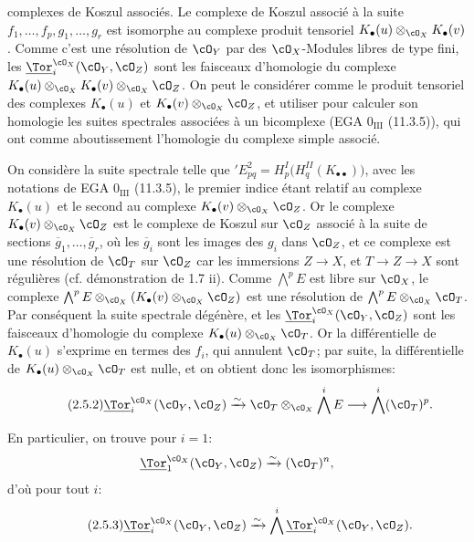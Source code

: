 complexes de Koszul associés. Le complexe de Koszul associé à la suite \(f_1,\ldots,f_p,g_1,\ldots,g_r\) est isomorphe au complexe produit tensoriel \(K_\bullet(u)\otimes_{\cO_X}K_\bullet(v)\). Comme c'est une résolution de \(\cO_Y\) par des \(\cO_X\)-Modules libres de type fini, les \(\underline{\Tor}_i^{\cO_X}(\cO_Y,\cO_Z)\) sont les faisceaux d'homologie du complexe \(K_\bullet(u)\otimes_{\cO_X}K_\bullet(v)\otimes_{\cO_X}\cO_Z\). On peut le considérer comme le produit tensoriel des complexes \(K_\bullet(u)\) et \(K_\bullet(v)\otimes_{\cO_X}\cO_Z\), et utiliser pour calculer son homologie les suites spectrales associées à un bicomplexe (EGA \(0_{\mathrm{III}}\) (11.3.5)), qui ont comme aboutissement l'homologie du complexe simple associé.

On considère la suite spectrale telle que \({}'E^2_{pq}=H^I_p\bigl(H^{II}_q(K_{\bullet\bullet})\bigr)\), avec les notations de EGA \(0_{\mathrm{III}}\) (11.3.5), le premier indice étant relatif au complexe \(K_\bullet(u)\) et le second au complexe \(K_\bullet(v)\otimes_{\cO_X}\cO_Z\). Or le complexe \(K_\bullet(v)\otimes_{\cO_X}\cO_Z\) est le complexe de Koszul sur \(\cO_Z\) associé à la suite de sections \(\overline g_1,\ldots,\overline g_r\), où les \(\overline g_i\) sont les images des \(g_i\) dans \(\cO_Z\), et ce complexe est une résolution de \(\cO_T\) sur \(\cO_Z\) car les immersions \(Z\to X\), et \(T\to Z\to X\) sont régulières (cf. démonstration de 1.7 ii). Comme \(\bigwedge^p E\) est libre sur \(\cO_X\), le complexe \(\bigwedge^pE\otimes_{\cO_X}(K_\bullet(v)\otimes_{\cO_X}\cO_Z)\) est une résolution de \(\bigwedge^pE\otimes_{\cO_X}\cO_T\). Par conséquent la suite spectrale dégénère, et les \(\underline{\Tor}_i^{\cO_X}(\cO_Y,\cO_Z)\) sont les faisceaux d'homologie du complexe \(K_\bullet(u)\otimes_{\cO_X}\cO_T\). Or la différentielle de \(K_\bullet(u)\) s'exprime en termes des \(f_i\), qui annulent \(\cO_T\); par suite, la différentielle de \(K_\bullet(u)\otimes_{\cO_X}\cO_T\) est nulle, et on obtient donc les isomorphismes:
\begin{equation}\tag{2.5.2}
\underline{\Tor}_i^{\cO_X}(\cO_Y,\cO_Z)
\xrightarrow{\sim}
\cO_T\otimes_{\cO_X}\bigwedge^iE
\longrightarrow
\bigwedge^i(\cO_T)^p.
\end{equation}

En particulier, on trouve pour \(i=1\):
\[
\underline{\Tor}_1^{\cO_X}(\cO_Y,\cO_Z)\xrightarrow{\sim}(\cO_T)^n,
\]
d'où pour tout \(i\):
\begin{equation}\tag{2.5.3}
\underline{\Tor}_i^{\cO_X}(\cO_Y,\cO_Z)
\xrightarrow{\sim}
\bigwedge^i\underline{\Tor}_i^{\cO_X}(\cO_Y,\cO_Z).
\end{equation}

